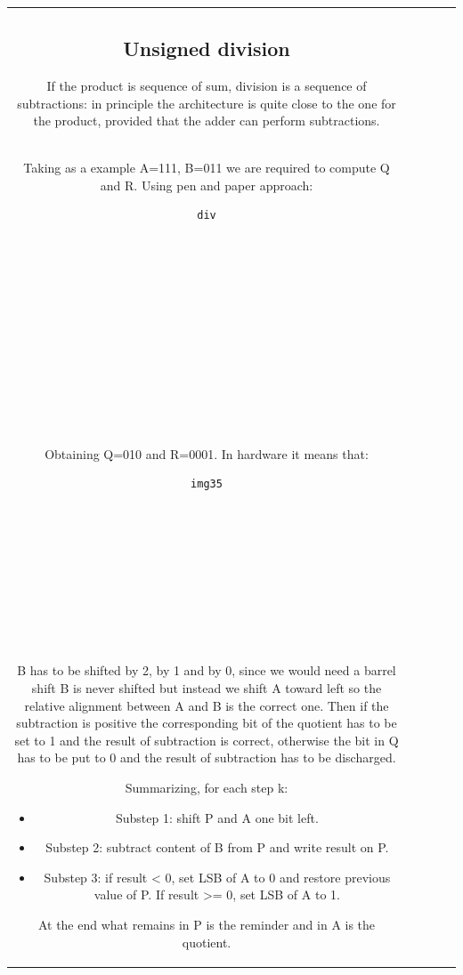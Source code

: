 \begin{center}
\begin{tabular}{|c|c|c|c|c|}
\subsection{Unsigned division}
If the product is sequence of sum, division is a sequence of subtractions: in principle the architecture is quite close to the one for the product, provided that the adder can perform subtractions.\\

Taking as a example A=111, B=011 we are required to compute Q and R. Using pen and paper approach:

\begin{verbatim}
div













\end{verbatim}

Obtaining Q=010 and R=0001. In hardware it means that:
\begin{verbatim}
img35










\end{verbatim}
B has to be shifted by 2, by 1 and by 0, since we would need a barrel shift B is never shifted but instead we shift A toward left so the relative alignment between A and B is the correct one. Then if the subtraction is positive the corresponding bit of the quotient has to be set to 1 and the result of subtraction is correct, otherwise the bit in Q has to be put to 0 and the result of subtraction has to be discharged.

Summarizing, for each step k:

\begin{itemize}
  \item Substep 1: shift P and A one bit left.
  \item Substep 2: subtract content of B from P and write result on P.
  \item Substep 3: if result < 0, set LSB of A to 0 and restore previous value of P.
  If result >= 0, set LSB of A to 1.
\end{itemize}

At the end what remains in P is the reminder and in A is the quotient.


\end{tabular}
\end{center}
